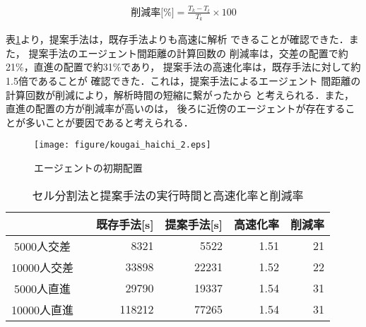 \documentclass{maelab_y}
\begin{document}
\begin{eqnarray}
  \label{eq:sakugenritu}
  \mbox{削減率[\%]} =
  \frac{T_{k} - T_{t}}{T_{k}} \times 100
\end{eqnarray}

表\ref{tab:result}より，提案手法は，既存手法よりも高速に解析
できることが確認できた．また，
提案手法のエージェント間距離の計算回数の
削減率は，交差の配置で約21\%，直進の配置で約31\%であり，
提案手法の高速化率は，既存手法に対して約1.5倍であることが
確認できた．これは，提案手法によるエージェント
間距離の計算回数が削減により，解析時間の短縮に繋がったから
と考えられる．また，直進の配置の方が削減率が高いのは，
後ろに近傍のエージェントが存在することが多いことが要因であると考えられる．

\begin{figure}[hbtp]
 \begin{center}
  \texttt{[image: figure/kougai\_haichi\_2.eps]}
  \caption{エージェントの初期配置}
  \label{fig:agent_haichi_image}
 \end{center}
\end{figure}
\fi

\begin{table}[hbtp]
  \begin{center}
    \caption{セル分割法と提案手法の実行時間と高速化率と削減率}
    \label{tab:result}
    \begin{tabular}{c|c|c|c|c}
      \hline \hline
        &　既存手法[s] & 提案手法[s] & 高速化率 & 削減率 \\
      \hline
      5000人交差 & \multicolumn{1}{|r|}{8321} &
       \multicolumn{1}{|r|}{5522} &
       \multicolumn{1}{|r|}{1.51} &
       \multicolumn{1}{|r}{21} \\
      \hline
      10000人交差 &
      \multicolumn{1}{|r|}{33898} &
      \multicolumn{1}{|r|}{22231} &
      \multicolumn{1}{|r|}{1.52}  &
      \multicolumn{1}{|r}{22} \\
      \hline
      5000人直進 &
      \multicolumn{1}{|r|}{29790} &
      \multicolumn{1}{|r|}{19337} &
      \multicolumn{1}{|r|}{1.54}  &
      \multicolumn{1}{|r}{31} \\
      \hline
      10000人直進 &
      \multicolumn{1}{|r|}{118212} &
      \multicolumn{1}{|r|}{77265} &
      \multicolumn{1}{|r|}{1.54} &
      \multicolumn{1}{|r}{31}  \\
      \hline
    \end{tabular}
  \end{center}
\end{table}
\end{document}
